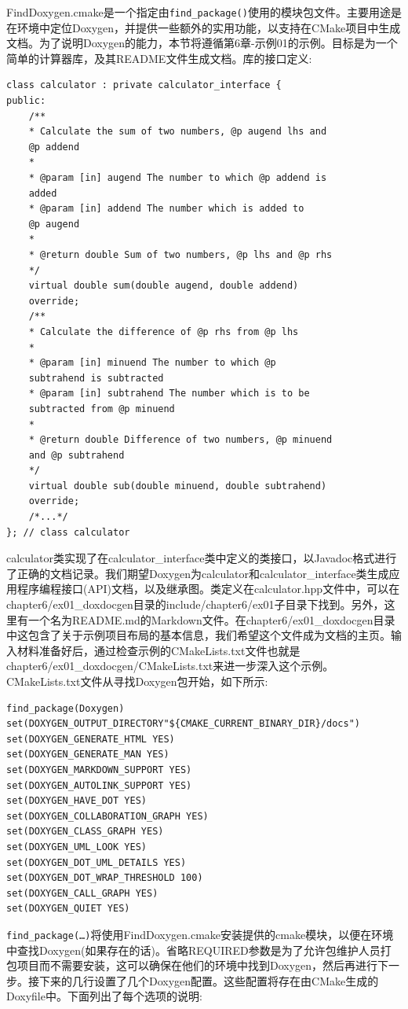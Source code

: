 FindDoxygen.cmake是一个指定由\texttt{find\_package()}使用的模块包文件。主要用途是在环境中定位Doxygen，并提供一些额外的实用功能，以支持在CMake项目中生成文档。为了说明Doxygen的能力，本节将遵循第6章-示例01的示例。目标是为一个简单的计算器库，及其README文件生成文档。库的接口定义:

\begin{lstlisting}[style=styleCXX]
class calculator : private calculator_interface {
public:
	/**
	* Calculate the sum of two numbers, @p augend lhs and
	@p addend
	*
	* @param [in] augend The number to which @p addend is
	added
	* @param [in] addend The number which is added to
	@p augend
	*
	* @return double Sum of two numbers, @p lhs and @p rhs
	*/
	virtual double sum(double augend, double addend)
	override;
	/**
	* Calculate the difference of @p rhs from @p lhs
	*
	* @param [in] minuend The number to which @p
	subtrahend is subtracted
	* @param [in] subtrahend The number which is to be
	subtracted from @p minuend
	*
	* @return double Difference of two numbers, @p minuend
	and @p subtrahend
	*/
	virtual double sub(double minuend, double subtrahend)
	override;
	/*...*/
}; // class calculator
\end{lstlisting}

calculator类实现了在calculator\_interface类中定义的类接口，以Javadoc格式进行了正确的文档记录。我们期望Doxygen为calculator和calculator\_interface类生成应用程序编程接口(API)文档，以及继承图。类定义在calculator.hpp文件中，可以在chapter6/ex01\_doxdocgen目录的include/chapter6/ex01子目录下找到。另外，这里有一个名为README.md的Markdown文件。在chapter6/ex01\_doxdocgen目录中这包含了关于示例项目布局的基本信息，我们希望这个文件成为文档的主页。输入材料准备好后，通过检查示例的CMakeLists.txt文件也就是chapter6/ex01\_doxdocgen/CMakeLists.txt来进一步深入这个示例。CMakeLists.txt文件从寻找Doxygen包开始，如下所示:

\begin{lstlisting}[style=styleCMake]
find_package(Doxygen)
set(DOXYGEN_OUTPUT_DIRECTORY"${CMAKE_CURRENT_BINARY_DIR}/docs")
set(DOXYGEN_GENERATE_HTML YES)
set(DOXYGEN_GENERATE_MAN YES)
set(DOXYGEN_MARKDOWN_SUPPORT YES)
set(DOXYGEN_AUTOLINK_SUPPORT YES)
set(DOXYGEN_HAVE_DOT YES)
set(DOXYGEN_COLLABORATION_GRAPH YES)
set(DOXYGEN_CLASS_GRAPH YES)
set(DOXYGEN_UML_LOOK YES)
set(DOXYGEN_DOT_UML_DETAILS YES)
set(DOXYGEN_DOT_WRAP_THRESHOLD 100)
set(DOXYGEN_CALL_GRAPH YES)
set(DOXYGEN_QUIET YES)
\end{lstlisting}

\texttt{find\_package(…)}将使用FindDoxygen.cmake安装提供的cmake模块，以便在环境中查找Doxygen(如果存在的话)。省略REQUIRED参数是为了允许包维护人员打包项目而不需要安装，这可以确保在他们的环境中找到Doxygen，然后再进行下一步。接下来的几行设置了几个Doxygen配置。这些配置将存在由CMake生成的Doxyfile中。下面列出了每个选项的说明:

